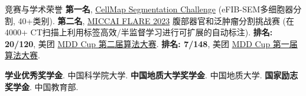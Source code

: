 \begin{rubric}{竞赛与学术荣誉}
\entry*[2026] \textbf{第一名}, \href{https://cellmapchallenge.janelia.org/}{CellMap Segmentation Challenge} (eFIB-SEM多细胞器分割, 40+类别).
\entry*[2023] \textbf{第二名}, \href{https://codalab.lisn.upsaclay.fr/competitions/12239}{MICCAI FLARE 2023} 腹部器官和泛肿瘤分割挑战赛 (在4000+ CT扫描上利用标签高效/半监督学习进行可扩展的自动标注).
\entry*[2018] \textbf{排名: 20/120}, 美团 \href{https://www.kaggle.com/competitions/mdd-cup-2018}{MDD Cup 第二届算法大赛}.
\entry*[2017] \textbf{排名: 7/148}, 美团 \href{https://www.kaggle.com/competitions/mdd-cup-2017}{MDD Cup 第一届算法大赛}.

\entry*[2015、2016、2017] \textbf{学业优秀奖学金}. 中国科学院大学.
\entry*[2012、2013、2014] \textbf{中国地质大学奖学金}. 中国地质大学.
\entry*[2012] \textbf{国家励志奖学金}. 中国教育部.

\end{rubric}
